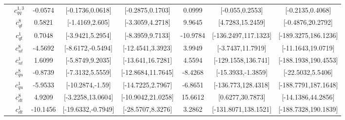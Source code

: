\documentclass{article}
\begin{document}
\begin{table}[H]
\begin{tabular}{|c|c|c|c|c|c|c|c|}
 & $c_{qq}^{1,3}$ & -0.0574                             & [-0.1736,0.0618]                                 & [-0.2875,0.1703] & 0.0999                             & [-0.055,0.2553]                                 & [-0.2135,0.4068] \\ \cline{2-8}
 & $c_{qt}^{8}$ & 0.5821                             & [-1.4169,2.605]                                 & [-3.3059,4.2718] & 9.9645                             & [4.7283,15.2459]                                 & [-0.4876,20.2792] \\ \cline{2-8}
 & $c_{qt}^{1}$ & 0.7048                             & [-3.9421,5.2954]                                 & [-8.3959,9.7133] & -10.9784                             & [-136.2497,117.1323]                                 & [-189.3275,186.1236] \\ \cline{2-8}
 & $c_{ut}^{8}$ & -4.5692                             & [-8.6172,-0.5494]                                 & [-12.4541,3.3923] & 3.9949                             & [-3.7437,11.7919]                                 & [-11.1643,19.0719] \\ \cline{2-8}
 & $c_{ut}^{1}$ & 1.6099                             & [-5.8749,9.2035]                                 & [-13.641,16.7281] & 4.5594                             & [-129.1558,136.741]                                 & [-188.1938,190.4553] \\ \cline{2-8}
 & $c_{qu}^{8}$ & -0.8739                             & [-7.3132,5.5559]                                 & [-12.8684,11.7645] & -8.4268                             & [-15.3933,-1.3859]                                 & [-22.5032,5.5406] \\ \cline{2-8}
 & $c_{qu}^{1}$ & -5.9533                             & [-10.2874,-1.59]                                 & [-14.7225,2.7967] & -6.8651                             & [-136.773,128.4318]                                 & [-188.7791,187.1648] \\ \cline{2-8}
 & $c_{dt}^{8}$ & 4.9209                             & [-3.2258,13.0604]                                 & [-10.9042,21.0258] & 15.6612                             & [0.6277,30.7873]                                 & [-14.1386,44.2856] \\ \cline{2-8}
 & $c_{dt}^{1}$ & -10.1456                             & [-19.6332,-0.7949]                                 & [-28.5707,8.3276] & 3.2862                             & [-131.8071,138.1521]                                 & [-188.7328,190.1839] \\ \cline{2-8}

\end{tabular}
\end{table}
\end{document}
